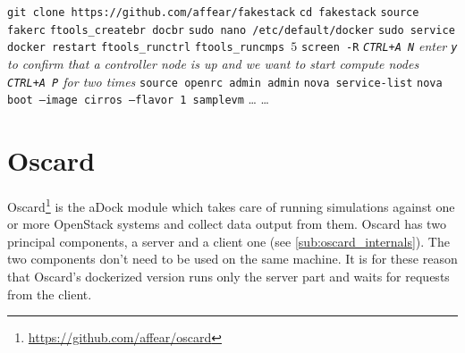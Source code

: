 \begin{algorithm}[H]
\caption{Launching a ``1 + 5'' architecture with aDock}
\label{alg:example}
\begin{algorithmic}[0]
	\State \texttt{git clone https://github.com/affear/fakestack}
	\State \texttt{cd fakestack}
	\State \texttt{source fakerc} 
	\State \texttt{ftools\_createbr docbr} 
	\State \texttt{sudo nano /etc/default/docker} 
	\State \texttt{sudo service docker restart}
	\State %
	\State \texttt{ftools\_runctrl}
	\State {}
	\State \texttt{ftools\_runcmps $5$}
	\State \texttt{screen -R} 
	\State \emph{\texttt{CTRL+A N}} 
	\State
	\State \emph{enter \texttt{y} to confirm that a controller node is up and we want to start compute nodes}
	\State
	\State {}
	\State \emph{\texttt{CTRL+A P} for two times} 
	\State \texttt{source openrc admin admin}
	\State \texttt{nova service-list} 
	\State \texttt{nova boot --image cirros --flavor 1 samplevm} 
	\State \ldots
	\State \ldots {}
\end{algorithmic}
\end{algorithm}


\section{Oscard}
\label{sec:oscard}
Oscard\footnote{\url{https://github.com/affear/oscard}} is the aDock module which takes care of running simulations against one or more OpenStack systems and collect data output from them. Oscard has two principal components, a server and a client one (see \ref{sub:oscard_internals}). The two components don't need to be used on the same machine. It is for these reason that Oscard's dockerized version runs only the server part and waits for requests from the client.


